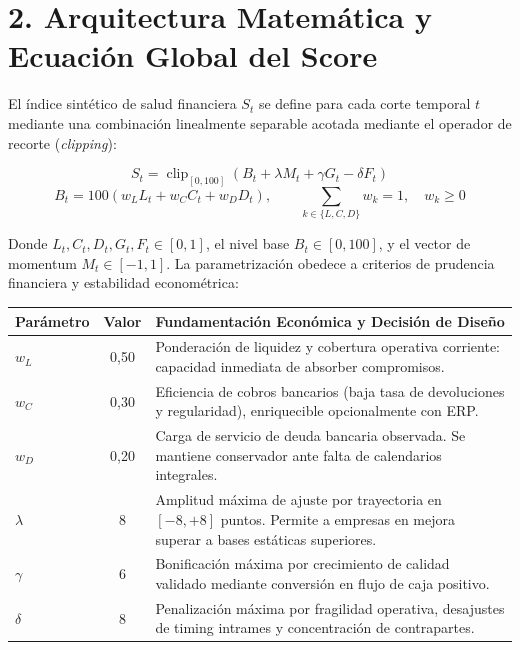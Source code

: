 \documentclass[10pt,a4paper]{article}
\begin{document}
\section*{2. Arquitectura Matemática y Ecuación Global del Score}

El índice sintético de salud financiera $S_t$ se define para cada corte temporal $t$ mediante una combinación linealmente separable acotada mediante el operador de recorte (\emph{clipping}):

\begin{tcolorbox}[formulabox]
\vspace{-0.2em}
\[
\boxed{S_t = \operatorname{clip}_{[0,100]}\left( B_t + \lambda M_t + \gamma G_t - \delta F_t \right)}
\]
\[
B_t = 100 \left( w_L L_t + w_C C_t + w_D D_t \right), \qquad \sum_{k \in \{L, C, D\}} w_k = 1, \quad w_k \geq 0
\]
\vspace{-0.4em}
\end{tcolorbox}

Donde $L_t, C_t, D_t, G_t, F_t \in [0, 1]$, el nivel base $B_t \in [0, 100]$, y el vector de momentum $M_t \in [-1, 1]$. La parametrización obedece a criterios de prudencia financiera y estabilidad econométrica:

\begin{center}
\small
\begin{tabularx}{\textwidth}{lcX}
\toprule
\textbf{Parámetro} & \textbf{Valor} & \textbf{Fundamentación Económica y Decisión de Diseño} \\
\midrule
$w_L$ & 0,50 & Ponderación de liquidez y cobertura operativa corriente: capacidad inmediata de absorber compromisos. \\
$w_C$ & 0,30 & Eficiencia de cobros bancarios (baja tasa de devoluciones y regularidad), enriquecible opcionalmente con ERP. \\
$w_D$ & 0,20 & Carga de servicio de deuda bancaria observada. Se mantiene conservador ante falta de calendarios integrales. \\
$\lambda$ & 8 & Amplitud máxima de ajuste por trayectoria en $[-8, +8]$ puntos. Permite a empresas en mejora superar a bases estáticas superiores. \\
$\gamma$ & 6 & Bonificación máxima por crecimiento de calidad validado mediante conversión en flujo de caja positivo. \\
$\delta$ & 8 & Penalización máxima por fragilidad operativa, desajustes de timing intrames y concentración de contrapartes. \\
\bottomrule
\end{tabularx}
\end{center}
\end{document}
